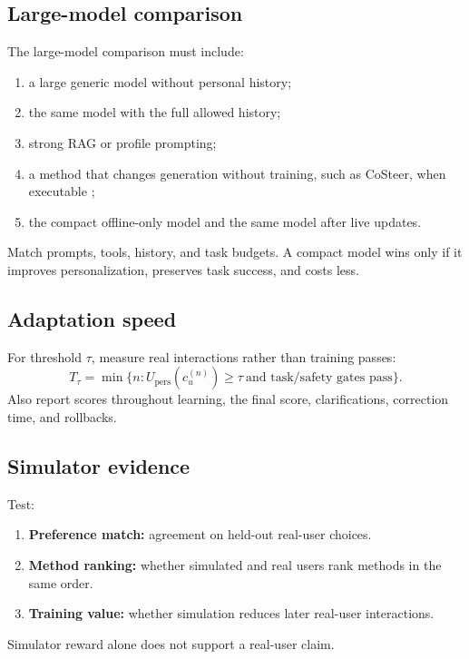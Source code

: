 \documentclass[11pt]{article}
\newcommand{\upers}{U_{\mathrm{pers}}}
\begin{document}
\subsection{Large-model comparison}

The large-model comparison must include:
\begin{enumerate}
  \item a large generic model without personal history;
  \item the same model with the full allowed history;
  \item strong RAG or profile prompting;
  \item a method that changes generation without training, such as CoSteer,
  when executable
  \citep{lv2025costeer};
  \item the compact offline-only model and the same model after live updates.
\end{enumerate}
Match prompts, tools, history, and task budgets.  A compact model wins only if
it improves personalization, preserves task success, and costs less.

\subsection{Adaptation speed}

For threshold $\tau$, measure real interactions rather than training passes:
\begin{equation}
  T_{\tau}
  =
  \min\{n:\upers(c_u^{(n)})\ge\tau
  \ \text{and task/safety gates pass}\}.
\end{equation}
Also report scores throughout learning, the final score, clarifications,
correction time, and rollbacks.

\subsection{Simulator evidence}

Test:
\begin{enumerate}
  \item \textbf{Preference match:} agreement on held-out real-user choices.
  \item \textbf{Method ranking:} whether simulated and real users rank methods
  in the same order.
  \item \textbf{Training value:} whether simulation reduces later real-user
  interactions.
\end{enumerate}
Simulator reward alone does not support a real-user claim.
\end{document}

